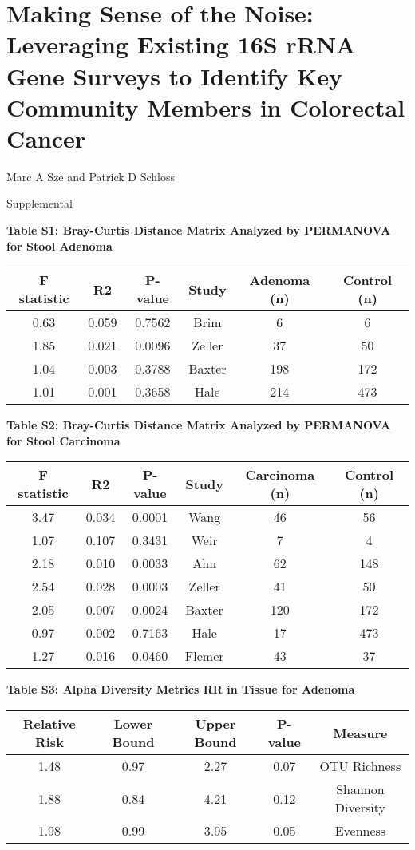 \documentclass[12pt,]{article}
\title{}
\author{}
\date{}
\begin{document}
\section{Making Sense of the Noise: Leveraging Existing 16S rRNA Gene
Surveys to Identify Key Community Members in Colorectal
Cancer}\label{making-sense-of-the-noise-leveraging-existing-16s-rrna-gene-surveys-to-identify-key-community-members-in-colorectal-cancer}

\vspace{10mm}

\begin{center}
Marc A Sze and Patrick D Schloss

\vspace{10mm}

Supplemental
\end{center}

\newpage

\textbf{Table S1: Bray-Curtis Distance Matrix Analyzed by PERMANOVA for
Stool Adenoma}

\begin{longtable}[]{@{}cccccc@{}}
\toprule
F statistic & R2 & P-value & Study & Adenoma (n) & Control
(n)\tabularnewline
\midrule
\endhead
0.63 & 0.059 & 0.7562 & Brim & 6 & 6\tabularnewline
1.85 & 0.021 & 0.0096 & Zeller & 37 & 50\tabularnewline
1.04 & 0.003 & 0.3788 & Baxter & 198 & 172\tabularnewline
1.01 & 0.001 & 0.3658 & Hale & 214 & 473\tabularnewline
\bottomrule
\end{longtable}

\newpage

\textbf{Table S2: Bray-Curtis Distance Matrix Analyzed by PERMANOVA for
Stool Carcinoma}

\begin{longtable}[]{@{}cccccc@{}}
\toprule
F statistic & R2 & P-value & Study & Carcinoma (n) & Control
(n)\tabularnewline
\midrule
\endhead
3.47 & 0.034 & 0.0001 & Wang & 46 & 56\tabularnewline
1.07 & 0.107 & 0.3431 & Weir & 7 & 4\tabularnewline
2.18 & 0.010 & 0.0033 & Ahn & 62 & 148\tabularnewline
2.54 & 0.028 & 0.0003 & Zeller & 41 & 50\tabularnewline
2.05 & 0.007 & 0.0024 & Baxter & 120 & 172\tabularnewline
0.97 & 0.002 & 0.7163 & Hale & 17 & 473\tabularnewline
1.27 & 0.016 & 0.0460 & Flemer & 43 & 37\tabularnewline
\bottomrule
\end{longtable}

\newpage

\textbf{Table S3: Alpha Diversity Metrics RR in Tissue for Adenoma}

\begin{longtable}[]{@{}ccccc@{}}
\toprule
Relative Risk & Lower Bound & Upper Bound & P-value &
Measure\tabularnewline
\midrule
\endhead
1.48 & 0.97 & 2.27 & 0.07 & OTU Richness\tabularnewline
1.88 & 0.84 & 4.21 & 0.12 & Shannon Diversity\tabularnewline
1.98 & 0.99 & 3.95 & 0.05 & Evenness\tabularnewline
\bottomrule
\end{longtable}
\end{document}
